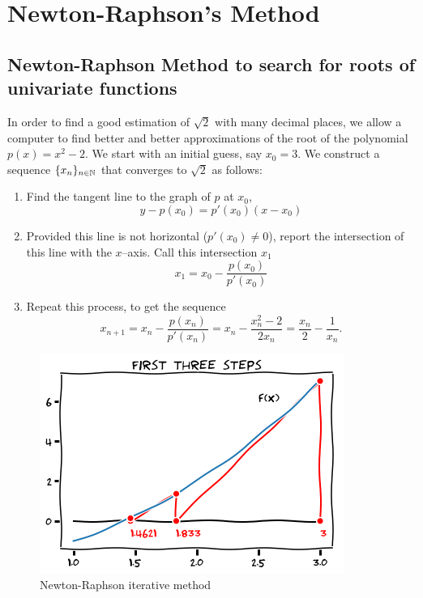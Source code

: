 
\section{Newton-Raphson's Method}

\subsection{Newton-Raphson Method to search for roots of univariate functions}

In order to find a good estimation of $\sqrt{2}$ with many decimal places, we allow a computer to find better and better approximations of the root  of the polynomial $p(x)=x^2-2$.  We start with an initial guess, say $x_0=3$.  We construct a sequence $\{ x_n \}_{n\in\mathbb{N}}$ that converges to $\sqrt{2}$ as follows:
\begin{enumerate}
\item Find the tangent line to the graph of $p$ at $x_0$, 
\begin{equation*}
y-p(x_0)=p'(x_0)(x-x_0)
\end{equation*}
\item Provided this line is not horizontal ($p'(x_0)\neq 0$), report the intersection of this line with the $x$--axis.  Call this intersection $x_1$
\begin{equation*}
x_1=x_0-\frac{p(x_0)}{p'(x_0)}
\end{equation*}
\item Repeat this process, to get the sequence 
\begin{equation*}
x_{n+1} = x_n - \frac{p(x_n)}{p'(x_n)} = x_n - \frac{x_n^2-2}{2x_n}=\frac{x_n}{2}-\frac{1}{x_n}.
\end{equation*}
\end{enumerate}
\begin{figure}[ht!]
\includegraphics[width=0.6\linewidth]{images/newton1.png}
\caption{Newton-Raphson iterative method}
\label{figure:Newton-Raphson}
\end{figure}
